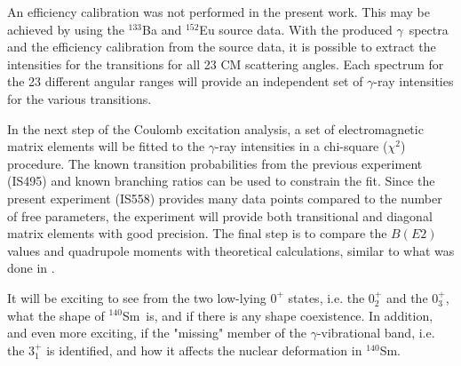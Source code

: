 \documentclass[twoside,english]{uiofysmaster/uiofysmaster}
\newcommand{\Sm}{$^{140}$Sm} %
\newcommand{\ga}{$\gamma$}
\begin{document}
An efficiency calibration was not performed in the present work. 
This may be achieved by using the $^{133}$Ba and $^{152}$Eu source data.
With the produced \ga\ spectra and the efficiency calibration from the source data, it is possible to extract the intensities for the transitions for all 23 CM scattering angles. 
Each spectrum for the 23 different angular ranges will provide an independent set of \ga-ray intensities for the various transitions. 

In the next step of the Coulomb excitation analysis, a set of electromagnetic matrix elements will be fitted to the \ga-ray intensities in a chi-square ($\chi^2$) procedure. 
The known transition probabilities from the previous experiment (IS495) and known branching ratios can be used to constrain the fit. 
Since the present experiment (IS558) provides many data points compared to the number of free parameters, the experiment will provide both transitional and diagonal matrix elements with good precision. 
The final step is to compare the $B(E2)$ values and quadrupole moments with theoretical calculations, similar to what was done in \cite{Klintefjord2016}.



It will be exciting to see from the two low-lying $0^+$ states, i.e. the $0_2^+$ and the $0_3^+$, what the shape of \Sm\ is, and if there is any shape coexistence. 
In addition, and even more exciting, if the "missing" member of the \ga-vibrational band, i.e. the $3_1^+$ is identified, and how it affects the nuclear deformation in \Sm. 
\end{document}
